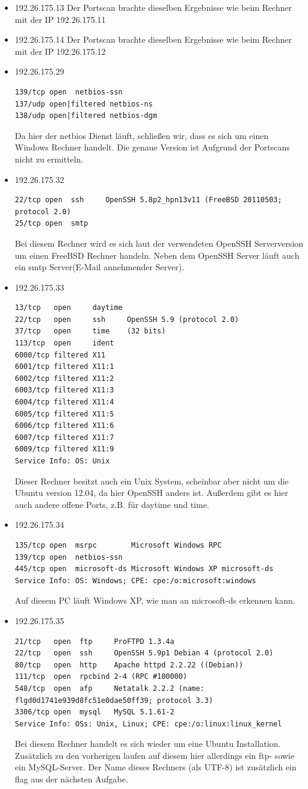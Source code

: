 \documentclass[10pt,a4paper]{article}
\begin{document}
\begin{itemize}
\item 192.26.175.13
Der Portscan brachte dieselben Ergebnisse wie beim Rechner mit der IP 192.26.175.11
\item 192.26.175.14
Der Portscan brachte dieselben Ergebnisse wie beim Rechner mit der IP 192.26.175.12
\item 192.26.175.29
\begin{verbatim}
139/tcp open  netbios-ssn
137/udp open|filtered netbios-ns
138/udp open|filtered netbios-dgm
\end{verbatim}
Da hier der netbios Dienst läuft, schließen wir, dass es sich um einen Windows Rechner handelt. Die genaue Version ist Aufgrund der Portscans nicht zu ermitteln.
\item 192.26.175.32
\begin{verbatim}
22/tcp open  ssh     OpenSSH 5.8p2_hpn13v11 (FreeBSD 20110503; protocol 2.0)
25/tcp open  smtp
\end{verbatim}
Bei diesem Rechner wird es sich laut der verwendeten OpenSSH Serverversion um einen FreeBSD Rechner handeln. Neben dem OpenSSH Server läuft auch ein smtp Server(E-Mail annehmender Server). 

\item 192.26.175.33
\begin{verbatim}
13/tcp   open     daytime
22/tcp   open     ssh     OpenSSH 5.9 (protocol 2.0)
37/tcp   open     time    (32 bits)
113/tcp  open     ident
6000/tcp filtered X11
6001/tcp filtered X11:1
6002/tcp filtered X11:2
6003/tcp filtered X11:3
6004/tcp filtered X11:4
6005/tcp filtered X11:5
6006/tcp filtered X11:6
6007/tcp filtered X11:7
6009/tcp filtered X11:9
Service Info: OS: Unix
\end{verbatim}
Dieser Rechner besitzt auch ein Unix System, scheinbar aber nicht um die Ubuntu version 12.04,
da hier OpenSSH anders ist. Außerdem gibt es hier auch andere offene Ports, z.B. für daytime und time.

\item 192.26.175.34
\begin{verbatim}
135/tcp open  msrpc        Microsoft Windows RPC
139/tcp open  netbios-ssn
445/tcp open  microsoft-ds Microsoft Windows XP microsoft-ds
Service Info: OS: Windows; CPE: cpe:/o:microsoft:windows
\end{verbatim}
Auf diesem PC läuft Windows XP, wie man an microsoft-ds erkennen kann.

\item 192.26.175.35
\begin{verbatim}
21/tcp   open  ftp     ProFTPD 1.3.4a
22/tcp   open  ssh     OpenSSH 5.9p1 Debian 4 (protocol 2.0)
80/tcp   open  http    Apache httpd 2.2.22 ((Debian))
111/tcp  open  rpcbind 2-4 (RPC #100000)
548/tcp  open  afp     Netatalk 2.2.2 (name: flgd0d1741e939d8fc51e0dae50ff39; protocol 3.3)
3306/tcp open  mysql   MySQL 5.1.61-2
Service Info: OSs: Unix, Linux; CPE: cpe:/o:linux:linux_kernel
\end{verbatim}
Bei diesem Rechner handelt es sich wieder um eine Ubuntu Installation. Zusätzlich zu den vorherigen laufen auf diesem hier allerdings ein ftp- sowie ein MySQL-Server. Der Name dieses Rechners (als UTF-8) ist zusätzlich ein flag aus der nächsten Aufgabe.


\end{itemize}
\end{document}
